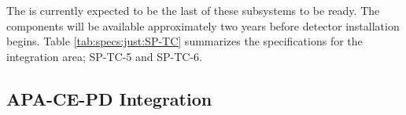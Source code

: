 The  is currently expected to be the last of these subsystems to be ready. The  components will be available approximately two years before detector installation begins. %
Table \ref{tab:specs:just:SP-TC} summarizes the specifications for the %
integration area;  SP-TC-5 and SP-TC-6.






\subsection{APA-CE-PD Integration}
\label{sec:fdsp-tc-itf-integ}


